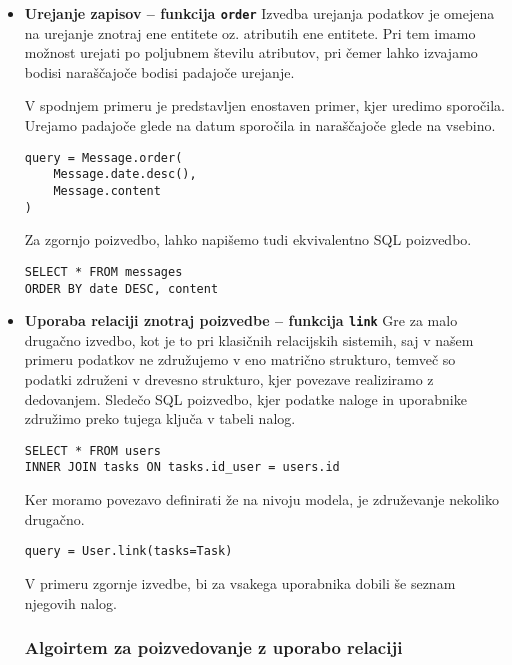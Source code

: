 \documentclass[a4paper,12pt,openright]{book}
\begin{document}
\begin{itemize}
        \item \textbf{Urejanje zapisov – funkcija {\tt order}} 
        \newline
        \noindent
        Izvedba urejanja podatkov je omejena na urejanje znotraj ene entitete oz. atributih ene entitete. Pri tem imamo možnost urejati po poljubnem številu atributov, pri čemer lahko izvajamo bodisi naraščajoče bodisi padajoče urejanje.

        V spodnjem primeru je predstavljen enostaven primer, kjer uredimo sporočila. Urejamo padajoče glede na datum sporočila in naraščajoče glede na vsebino.

\begin{verbatim}
query = Message.order(
    Message.date.desc(),
    Message.content
)
\end{verbatim}    

        \noindent
        Za zgornjo poizvedbo, lahko napišemo tudi ekvivalentno SQL poizvedbo.

\begin{verbatim}
SELECT * FROM messages
ORDER BY date DESC, content
\end{verbatim}          

        \item \textbf{Uporaba relaciji znotraj poizvedbe – funkcija {\tt link}}
        \newline
        \noindent
        Gre za malo drugačno izvedbo, kot je to pri klasičnih relacijskih sistemih, saj v našem primeru podatkov ne združujemo v eno matrično strukturo, temveč so podatki združeni v drevesno strukturo, kjer povezave realiziramo z dedovanjem. Sledečo SQL poizvedbo, kjer podatke naloge in uporabnike združimo preko tujega ključa v tabeli nalog.

\begin{verbatim}
SELECT * FROM users
INNER JOIN tasks ON tasks.id_user = users.id
\end{verbatim}

        \noindent
        Ker moramo povezavo definirati že na nivoju modela, je združevanje nekoliko drugačno.

\begin{verbatim}
query = User.link(tasks=Task)
\end{verbatim}

        \noindent
        V primeru zgornje izvedbe, bi za vsakega uporabnika dobili še seznam njegovih nalog.

        \subsubsection{Algoirtem za poizvedovanje z uporabo relaciji}


\end{itemize}
\end{document}
